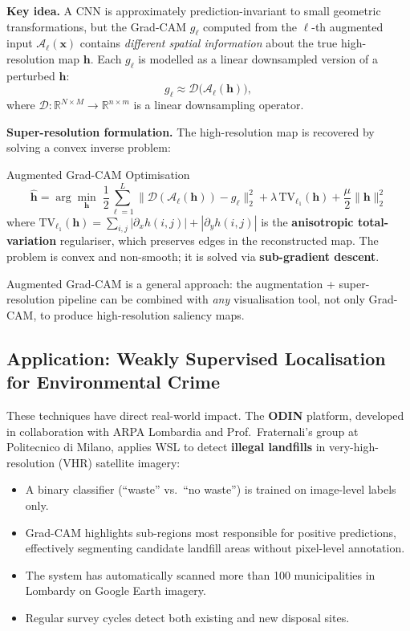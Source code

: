 \documentclass[11pt,a4paper]{article}
\newcommand{\term}[1]{\textcolor{DefGreen}{\textbf{#1}}}
\begin{document}
\textbf{Key idea.} A CNN is approximately prediction-invariant to small geometric transformations, but the Grad-CAM $g_\ell$ computed from the $\ell$-th augmented input $\mathcal{A}_\ell(\mathbf{x})$ contains \emph{different spatial information} about the true high-resolution map $\mathbf{h}$. Each $g_\ell$ is modelled as a linear downsampled version of a perturbed $\mathbf{h}$:
\[
g_\ell \approx \mathcal{D}\!\bigl(\mathcal{A}_\ell(\mathbf{h})\bigr),
\]
where $\mathcal{D}: \mathbb{R}^{N\times M} \to \mathbb{R}^{n\times m}$ is a linear downsampling operator.

\textbf{Super-resolution formulation.} The high-resolution map is recovered by solving a convex inverse problem:

\begin{thmbox}{Augmented Grad-CAM Optimisation}
\[
\hat{\mathbf{h}} = \arg\min_{\mathbf{h}} \;
\frac{1}{2}\sum_{\ell=1}^{L}\bigl\lVert \mathcal{D}(\mathcal{A}_\ell(\mathbf{h})) - g_\ell \bigr\rVert_2^2
+ \lambda \, \mathrm{TV}_{\ell_1}(\mathbf{h}) + \frac{\mu}{2}\lVert\mathbf{h}\rVert_2^2
\]
where $\mathrm{TV}_{\ell_1}(\mathbf{h}) = \sum_{i,j}|\partial_x h(i,j)| + |\partial_y h(i,j)|$ is the \term{anisotropic total-variation} regulariser, which preserves edges in the reconstructed map. The problem is convex and non-smooth; it is solved via \textbf{sub-gradient descent}.
\end{thmbox}

\begin{insightbox}
Augmented Grad-CAM is a general approach: the augmentation + super-resolution pipeline can be combined with \emph{any} visualisation tool, not only Grad-CAM, to produce high-resolution saliency maps.
\end{insightbox}

\subsection{Application: Weakly Supervised Localisation for Environmental Crime}

These techniques have direct real-world impact. The \term{ODIN} platform, developed in collaboration with ARPA Lombardia and Prof.\ Fraternali's group at Politecnico di Milano, applies WSL to detect \textbf{illegal landfills} in very-high-resolution (VHR) satellite imagery:

\begin{itemize}
  \item A binary classifier (``waste'' vs.\ ``no waste'') is trained on image-level labels only.
  \item Grad-CAM highlights sub-regions most responsible for positive predictions, effectively segmenting candidate landfill areas without pixel-level annotation.
  \item The system has automatically scanned more than 100 municipalities in Lombardy on Google Earth imagery.
  \item Regular survey cycles detect both existing and new disposal sites.
\end{itemize}
\end{document}
